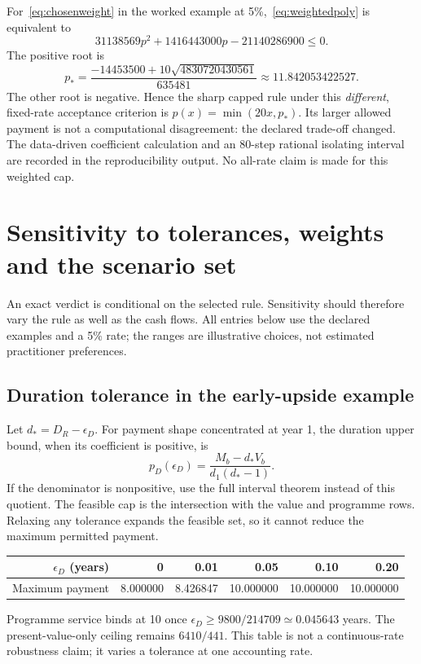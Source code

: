 \documentclass[11pt,a4paper]{article}
\begin{document}
For~\eqref{eq:chosenweight} in the worked example at 5\%,~\eqref{eq:weightedpoly} is equivalent to
\begin{equation}
 31138569p^2+1416443000p-21140286900\leq0.
\end{equation}
The positive root is
\begin{equation}
 p_* = \frac{-14453500+10\sqrt{4830720430561}}{635481}
       \approx11.842053422527.
\end{equation}
The other root is negative. Hence the sharp capped rule under this \emph{different}, fixed-rate acceptance criterion is $p(x)=\min(20x,p_*)$. Its larger allowed payment is not a computational disagreement: the declared trade-off changed. The data-driven coefficient calculation and an 80-step rational isolating interval are recorded in the reproducibility output. No all-rate claim is made for this weighted cap.

\section{Sensitivity to tolerances, weights and the scenario set}\label{sec:sensitivity}
An exact verdict is conditional on the selected rule. Sensitivity should therefore vary the rule as well as the cash flows. All entries below use the declared examples and a 5\% rate; the ranges are illustrative choices, not estimated practitioner preferences.

\subsection{Duration tolerance in the early-upside example}
Let $d_*=D_R-\epsilon_D$. For payment shape concentrated at year 1, the duration upper bound, when its coefficient is positive, is
\[
p_D(\epsilon_D)=\frac{M_b-d_*V_b}{d_1(d_*-1)}.
\]
If the denominator is nonpositive, use the full interval theorem instead of this quotient. The feasible cap is the intersection with the value and programme rows. Relaxing any tolerance expands the feasible set, so it cannot reduce the maximum permitted payment.
\begin{center}
\begin{tabular}{rrrrrr}\toprule
$\epsilon_D$ (years)&0&0.01&0.05&0.10&0.20\\\midrule
Maximum payment&8.000000&8.426847&10.000000&10.000000&10.000000\\\bottomrule
\end{tabular}
\end{center}
Programme service binds at 10 once $\epsilon_D\geq9800/214709\simeq0.045643$ years. The present-value-only ceiling remains $6410/441$. This table is not a continuous-rate robustness claim; it varies a tolerance at one accounting rate.
\end{document}
